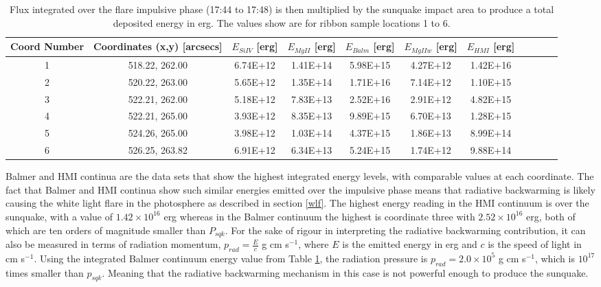 \begin{table}[h]
\centering
\begin{tabular}{|c|c|c|c|c|c|c|c|c|c|c|}
Coord Number & Coordinates (x,y) [arcsecs] & $E_{Si IV}$ [erg] & $E_{Mg II}$ [erg] & $E_{Balm}$ [erg] & $E_{Mg II w}$ [erg] & $E_{HMI}$ [erg]\\
\hline
1 & 518.22, 262.00 & 6.74E+12 & 1.41E+14 & 5.98E+15 & 4.27E+12 & 1.42E+16\\
2 & 520.22, 263.00 & 5.65E+12 & 1.35E+14 & 1.71E+16 & 7.14E+12 & 1.10E+15\\
3 & 522.21, 262.00 & 5.18E+12 & 7.83E+13 & 2.52E+16 & 2.91E+12 & 4.82E+15\\
4 & 522.21, 265.00 & 3.93E+12 & 8.35E+13 & 9.89E+15 & 6.70E+13 & 1.28E+15\\
5 & 524.26, 265.00 & 3.98E+12 & 1.03E+14 & 4.37E+15 & 1.86E+13 & 8.99E+14\\
6 & 526.25, 263.82 & 6.91E+12 & 6.34E+13 & 5.24E+15 & 1.74E+12 & 9.88E+14\\
\end{tabular}
\caption{Flux integrated over the flare impulsive phase (17:44 to 17:48) is then multiplied by the sunquake impact area to produce a total deposited energy in erg. The values show are for ribbon sample locations 1 to 6.}\label{eimp}
\end{table}
\noindent
Balmer and HMI continua are the data sets that show the highest integrated energy levels, with comparable values at each coordinate. The fact that Balmer and HMI continua show such similar energies emitted over the impulsive phase means that radiative backwarming is likely causing the white light flare in the photosphere as described in section \ref{wlf}. The highest energy reading in the HMI continuum is over the sunquake, with a value of $1.42{\times}10^{16}$ erg whereas in the Balmer continuum the highest is coordinate three with $2.52{\times}10^{16}$ erg, both of which are ten orders of magnitude smaller than $P_{sqk}$. For the sake of rigour in interpreting the radiative backwarming contribution, it can also be measured in terms of radiation momentum, $p_{rad}=\frac{E}{c}$ g cm s$^{-1}$, where $E$ is the emitted energy in erg and $c$ is the speed of light in cm s$^{-1}$. Using the integrated Balmer continuum energy value from Table \ref{eimp}, the radiation pressure is $p_{rad} = 2.0{\times}10^{5}$ g cm s$^{-1}$, which is $10^{17}$ times smaller than $p_{sqk}$. Meaning that the radiative backwarming mechanism in this case is not powerful enough to produce the sunquake. \\ 

